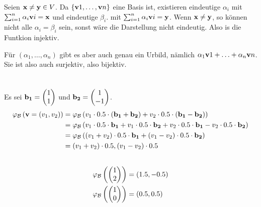 \documentclass{../mfa}
\begin{document}
Seien $\mathbf{x} \neq \mathbf{y} \in V$.
Da $\{\mathbf{v}{1}, \ldots, \mathbf{v}{n}\}$ eine Basis ist, existieren eindeutige $\alpha_i$ mit $\sum_{i=1}^n \alpha_i \mathbf{v}{i} =
\mathbf{x}$ und eindeutige $\beta_i$. mit $\sum_{i=1}^n \alpha_i \mathbf{v}{i} =
\mathbf{y}$.
Wenn $\mathbf{x} \neq \mathbf{y}$, so können nicht alle $\alpha_i = \beta_i$ sein, sonst wäre die Darstellung nicht eindeutig.
Also is die Funtkion injektiv. 

Für $(\alpha_1,\ldots,\alpha_n)$ gibt es aber auch genau ein Urbild, nämlich $\alpha_1\mathbf{v}{1} + \ldots + \alpha_n\mathbf{v}{n}$.
Sie ist also auch surjektiv, also bijektiv.

\section{}

\subsection{}

\renewcommand{\b}[1]{\mbf{b_{#1}}}
Es sei $\b{1} = \inlinepmatrix{1 \\ 1}$ und $\b{2} = \inlinepmatrix{1 \\ -1}$.
\begin{align*}
   \myphi{\v{}=(v_1,v_2)} & = \myphi{v_1 \cdot 0.5 \cdot (\b{1} + \b{2}) + v_2 \cdot 0.5 \cdot (\b{1} - \b{2})} \\
                          & = \myphi{v_1 \cdot 0.5 \cdot \b{1} + v_1 \cdot 0.5 \cdot \b{2} + v_2 \cdot 0.5 \cdot \b{1} -
v_2 \cdot 0.5 \cdot \b{2}}  \\
                          & = \myphi{(v_1 + v_2) \cdot 0.5  \cdot \b{1} + (v_1 - v_2) \cdot 0.5 \cdot \b{2}}  \\
                          & = (v_1 + v_2) \cdot 0.5, (v_1 - v_2) \cdot 0.5  \\
\end{align*}

\subsection{}

\begin{align*}
   \varphi_\mathcal{B}\left(\begin{pmatrix}1 \\ 2\end{pmatrix}\right) &= (1.5, -0.5) \\
   \varphi_\mathcal{B}\left(\begin{pmatrix}1 \\ 0\end{pmatrix}\right) &= (0.5, 0.5)
\end{align*}
\end{document}
